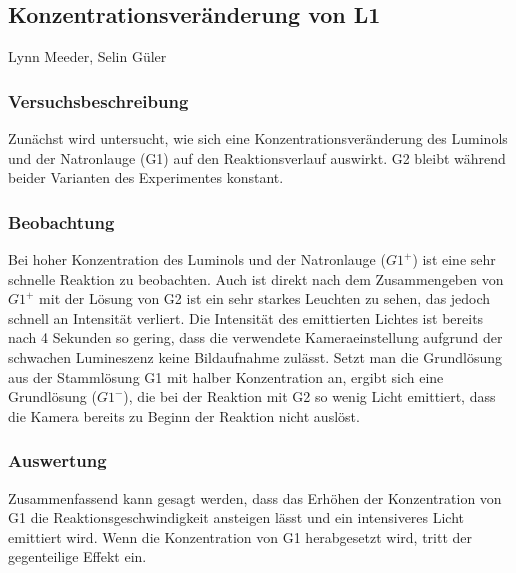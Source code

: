 \subsection{Konzentrationsveränderung von L1} 

Lynn Meeder, Selin Güler

\subsubsection{Versuchsbeschreibung}

Zunächst wird untersucht, wie sich eine Konzentrationsveränderung des Luminols und der Natronlauge (G1) auf den Reaktionsverlauf auswirkt. G2 bleibt während beider Varianten des Experimentes konstant. 

\subsubsection{Beobachtung}

Bei hoher Konzentration des Luminols und der Natronlauge ($G1^+$) ist eine sehr schnelle Reaktion zu beobachten. Auch ist direkt nach dem Zusammengeben von $G1^+$ mit der Lösung von G2 ist ein sehr starkes Leuchten zu sehen, das jedoch schnell an Intensität verliert. Die Intensität des emittierten Lichtes ist bereits nach 4 Sekunden so gering, dass die verwendete Kameraeinstellung aufgrund der schwachen Lumineszenz keine Bildaufnahme zulässt. Setzt man die Grundlösung aus der Stammlösung G1 mit halber Konzentration an, ergibt sich eine Grundlösung ($G1^-$), die bei der Reaktion mit G2 so wenig Licht emittiert, dass die Kamera bereits zu Beginn der Reaktion nicht auslöst.

\subsubsection{Auswertung}

Zusammenfassend kann gesagt werden, dass das Erhöhen der Konzentration von G1 die Reaktionsgeschwindigkeit ansteigen lässt und ein intensiveres Licht emittiert wird. Wenn die Konzentration von G1 herabgesetzt wird, tritt der gegenteilige Effekt ein.